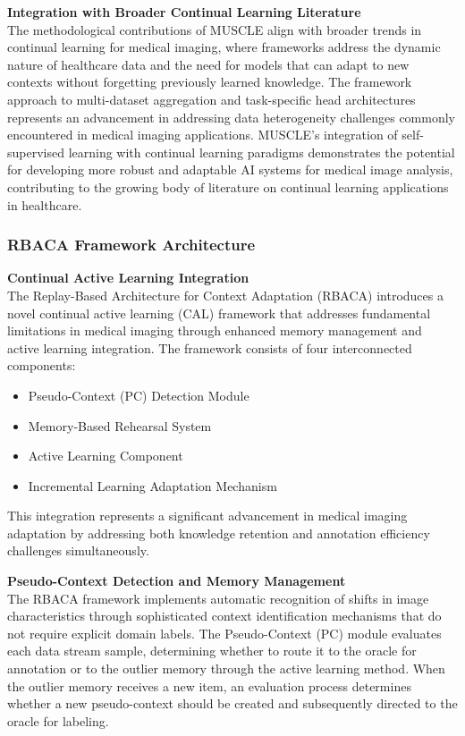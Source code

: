 \documentclass{IEEEcsmag}
\begin{document}
    \textbf{Integration with Broader Continual Learning Literature}\\
    The methodological contributions of MUSCLE align with broader trends in continual learning for medical imaging, where frameworks address the dynamic nature of healthcare data and the need for models that can adapt to new contexts without forgetting previously learned knowledge\cite{cite-18}.
    The framework approach to multi-dataset aggregation and task-specific head architectures represents an advancement in addressing data heterogeneity challenges commonly encountered in medical imaging applications\cite{cite-17}. 
    MUSCLE's integration of self-supervised learning with continual learning paradigms demonstrates the potential for developing more robust and adaptable AI systems for medical image analysis, contributing to the growing body of literature on continual learning applications in healthcare\cite{cite-27}.



    \subsubsection{RBACA Framework Architecture} 
    
    \textbf{Continual Active Learning Integration}\\
    The Replay-Based Architecture for Context Adaptation (RBACA) introduces a novel continual active learning (CAL) framework that addresses fundamental limitations in medical imaging through enhanced memory management and active learning integration\cite{cite-19}.
    The framework consists of four interconnected components:
    \begin{itemize}
        \item Pseudo-Context (PC) Detection Module
        \item Memory-Based Rehearsal System  
        \item Active Learning Component
        \item Incremental Learning Adaptation Mechanism
    \end{itemize}
    This integration represents a significant advancement in medical imaging adaptation by addressing both knowledge retention and annotation efficiency challenges simultaneously\cite{cite-19}.
    
    \textbf{Pseudo-Context Detection and Memory Management}\\
    The RBACA framework implements automatic recognition of shifts in image characteristics through sophisticated context identification mechanisms that do not require explicit domain labels.
    The Pseudo-Context (PC) module evaluates each data stream sample, determining whether to route it to the oracle for annotation or to the outlier memory through the active learning method\cite{cite-19}.
    When the outlier memory receives a new item, an evaluation process determines whether a new pseudo-context should be created and subsequently directed to the oracle for labeling.
    
\end{document}
